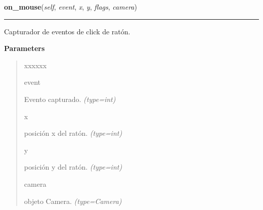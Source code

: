\hspace{.8\funcindent}\begin{boxedminipage}{\funcwidth}

    \raggedright \textbf{on\_mouse}(\textit{self}, \textit{event}, \textit{x}, \textit{y}, \textit{flags}, \textit{camera})

    \vspace{-1.5ex}

    \rule{\textwidth}{0.5\fboxrule}
\setlength{\parskip}{2ex}
Capturador de eventos de click de ratón.

\setlength{\parskip}{1ex}
      \textbf{Parameters}
      \vspace{-1ex}

      \begin{quote}
        \begin{Ventry}{xxxxxx}

          \item[event]


Evento capturado.
            {\it (type=int)}

          \item[x]


posición x del ratón.
            {\it (type=int)}

          \item[y]


posición y del ratón.
            {\it (type=int)}

          \item[camera]


objeto Camera.
            {\it (type=Camera)}

        \end{Ventry}

      \end{quote}

    \end{boxedminipage}

    \label{src:cameras:Cameras:check_cameras}

    \vspace{0.5ex}

